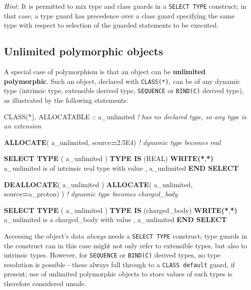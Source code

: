 \documentclass[
  paper=a4,
  ,captions=tableheading
]{scrartcl}
\newenvironment{Shaded}{\begin{snugshade}}{\end{snugshade}}
\newcommand{\CommentTok}[1]{\textcolor[rgb]{0.56,0.35,0.01}{\textit{#1}}}
\newcommand{\DataTypeTok}[1]{\textcolor[rgb]{0.13,0.29,0.53}{#1}}
\newcommand{\FloatTok}[1]{\textcolor[rgb]{0.00,0.00,0.81}{#1}}
\newcommand{\FunctionTok}[1]{\textcolor[rgb]{0.13,0.29,0.53}{\textbf{#1}}}
\newcommand{\KeywordTok}[1]{\textcolor[rgb]{0.13,0.29,0.53}{\textbf{#1}}}
\newcommand{\NormalTok}[1]{#1}
\newcommand{\StringTok}[1]{\textcolor[rgb]{0.31,0.60,0.02}{#1}}
\begin{document}
\emph{Hint:} It is permitted to mix type and class guards in a
\texttt{SELECT\ TYPE} construct; in that case, a type guard has
precedence over a class guard specifying the same type with respect to
selection of the guarded statements to be executed.

\subsection{Unlimited polymorphic
objects}\label{unlimited-polymorphic-objects}

A special case of polymorphism is that an object can be
\textbf{unlimited polymorphic}. Such an object, declared with
\texttt{CLASS(*)}, can be of any dynamic type (intrinsic type,
extensible derived type, \texttt{SEQUENCE} or \texttt{BIND(C)} derived
type), as illustrated by the following statements:

\begin{Shaded}
\begin{Highlighting}[]
\DataTypeTok{CLASS(*)}\NormalTok{, }\DataTypeTok{ALLOCATABLE} \DataTypeTok{::}\NormalTok{ a\_unlimited  }\CommentTok{! has no declared type, so any type is an extension}

\KeywordTok{ALLOCATE}\NormalTok{( a\_unlimited, source}\KeywordTok{=}\FloatTok{2.5}\NormalTok{E4)  }\CommentTok{! dynamic type becomes real}

\KeywordTok{SELECT TYPE}\NormalTok{ ( a\_unlimited )}
\KeywordTok{TYPE IS}\NormalTok{ (}\DataTypeTok{REAL}\NormalTok{)}
   \FunctionTok{WRITE(*}\NormalTok{,}\FunctionTok{*)} \StringTok{\textquotesingle{}a\_unlimited is of intrinsic real type with value \textquotesingle{}}\NormalTok{, a\_unlimited}
\KeywordTok{END SELECT}

\KeywordTok{DEALLOCATE}\NormalTok{( a\_unlimited )}
\KeywordTok{ALLOCATE}\NormalTok{( a\_unlimited, source}\KeywordTok{=}\NormalTok{a\_proton) )  }\CommentTok{! dynamic type becomes charged\_body}

\KeywordTok{SELECT TYPE}\NormalTok{ ( a\_unlimited )}
\KeywordTok{TYPE IS}\NormalTok{ (charged\_body)}
   \FunctionTok{WRITE(*}\NormalTok{,}\FunctionTok{*)} \StringTok{\textquotesingle{}a\_unlimited is a charged\_body with value \textquotesingle{}}\NormalTok{, a\_unlimited}
\KeywordTok{END SELECT}
\end{Highlighting}
\end{Shaded}

Accessing the object's data \emph{always} needs a \texttt{SELECT\ TYPE}
construct; type guards in the construct can in this case might not only
refer to extensible types, but also to intrinsic types. However, for
\texttt{SEQUENCE} or \texttt{BIND(C)} derived types, no type resolution
is possible - these always fall through to a \texttt{CLASS\ default}
guard, if present; use of unlimited polymorphic objects to store values
of such types is therefore considered unsafe.
\end{document}
